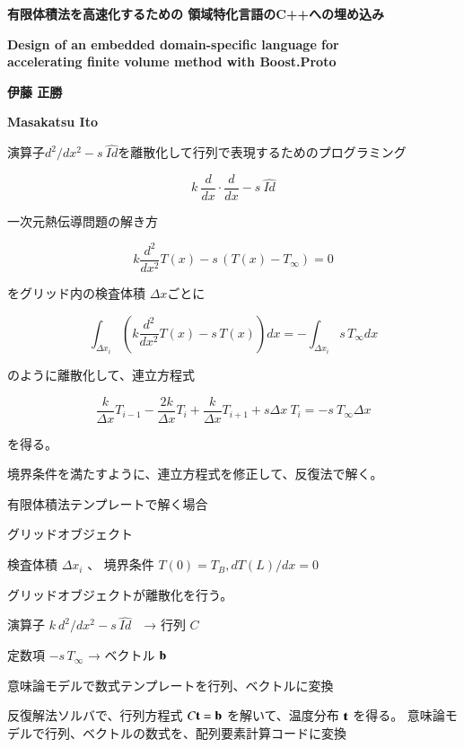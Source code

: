 \documentclass[a4j,11pt]{jarticle}
\begin{document}
\renewcommand{\baselinestretch}{1.12}\small\normalsize
\begin{center}
  \textbf{\Large 有限体積法を高速化するための 領域特化言語のC++への埋め込み}
  
  \textbf{\large Design of an embedded domain-specific language for\\ 
accelerating finite volume method with Boost.Proto}
\end{center}
\begin{center}  
  \textbf{伊藤 正勝}

  \textbf{Masakatsu Ito}

\end{center}

演算子\(  d^2 / dx^2 - s\ \hat{Id} \)を離散化して行列で表現するためのプログラミング

\[ k \ \frac{d}{dx} \cdot  \frac{d}{dx} - s\ \hat{Id}  \]


一次元熱伝導問題の解き方

\[ k \frac{d^2}{dx^2} T(x) - s \, ( T(x) - T_\infty ) = 0    \]

をグリッド内の検査体積 \(\Delta x\)ごとに

\[ \int_{\Delta x_i} \left(  k \frac{d^2}{dx^2} T(x) - s \, T(x)   \right) dx =  - \int_{\Delta x_i} s \, T_\infty dx  \]

のように離散化して、連立方程式

\[ \frac{k}{\Delta x} T_{i-1} - \frac{2 k}{\Delta x}T_i +  \frac{k}{\Delta x} T_{i+1} + s  \Delta x\ T_i =  - s\ T_\infty \Delta x   \]

を得る。


境界条件を満たすように、連立方程式を修正して、反復法で解く。

 

有限体積法テンプレートで解く場合

    グリッドオブジェクト

        検査体積 \( \Delta x_i\) 、 境界条件 \( T(0) = T_B , d T(L) / dx = 0 \)

    グリッドオブジェクトが離散化を行う。

        演算子 \(  k\ d^2 / dx^2 - s\ \hat{Id} \)　→ 行列 \(C\)

        定数項 \( - s \, T_\infty \) → ベクトル \( \bf b \)

            意味論モデルで数式テンプレートを行列、ベクトルに変換

    反復解法ソルバで、行列方程式 \( C {\bf t} = {\bf b} \) を解いて、温度分布 \( \bf t\) を得る。
        意味論モデルで行列、ベクトルの数式を、配列要素計算コードに変換
\end{document}
